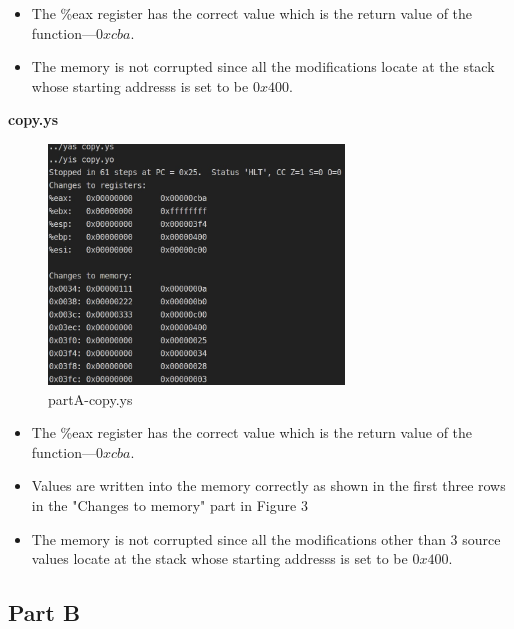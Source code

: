 \documentclass{article}
\begin{document}
\begin{itemize}
        \item The \%eax register has the correct value which is the return value of the function---$0xcba$.
        \item The memory is not corrupted since all the modifications locate at the stack whose starting addresss is set to be $0x400$.
\end{itemize}

\textbf{copy.ys}\\

\begin{figure}[H] %
        \centering %
        \includegraphics[width=0.7\textwidth]{partA-copy.jpg} %
        \caption{partA-copy.ys} %
        \label{Fig.partA-copy} %
\end{figure}

\begin{itemize}
        \item The \%eax register has the correct value which is the return value of the function---$0xcba$.
        \item Values are written into the memory correctly as shown in the first three rows in the "Changes to memory" part in Figure 3
        \item The memory is not corrupted since all the modifications other than 3 source values locate at the stack whose starting addresss is set to be $0x400$.
\end{itemize}

\subsection{Part B}
\end{document}

